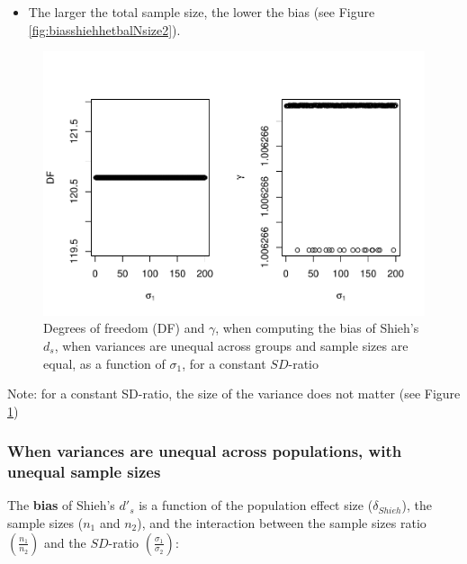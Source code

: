 \documentclass[
  man]{apa6}
\providecommand{\tightlist}{%
  \setlength{\itemsep}{0pt}\setlength{\parskip}{0pt}}
\begin{document}
\begin{itemize}
\tightlist
\item
  The larger the total sample size, the lower the bias (see Figure \ref{fig:biasshiehhetbalNsize2}).
\end{itemize}

\begin{figure}
\centering
\includegraphics{Theoretical-Bias-of-all-estimators-as-a-function-of-population-parameters_files/figure-latex/biasshiehhetbalvariance2-1.pdf}
\caption{\label{fig:biasshiehhetbalvariance2}Degrees of freedom (DF) and \(\gamma\), when computing the bias of Shieh's \(d_s\), when variances are unequal across groups and sample sizes are equal, as a function of \(\sigma_1\), for a constant \(SD\)-ratio}
\end{figure}

Note: for a constant SD-ratio, the size of the variance does not matter (see Figure \ref{fig:biasshiehhetbalvariance2})

\hypertarget{when-variances-are-unequal-across-populations-with-unequal-sample-sizes-1}{%
\subsubsection{When variances are unequal across populations, with unequal sample sizes}\label{when-variances-are-unequal-across-populations-with-unequal-sample-sizes-1}}

The \textbf{bias} of Shieh's \(d'_s\) is a function of the population effect size (\(\delta_{Shieh}\)), the sample sizes (\(n_1\) and \(n_2\)), and the interaction between the sample sizes ratio \(\left(\frac{n_1}{n_2} \right)\) and the \(SD\)-ratio \(\left(\frac{\sigma_1}{\sigma_2} \right)\):
\end{document}
